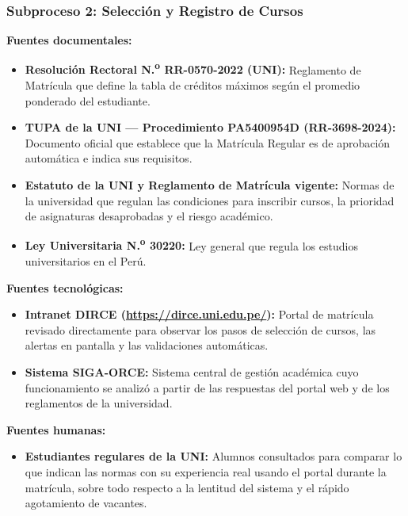 \subsubsection{Subproceso 2: Selección y Registro de Cursos}

\textbf{Fuentes documentales:}
\begin{itemize}
    \item \textbf{Resolución Rectoral N.\textsuperscript{o} RR-0570-2022 (UNI):} Reglamento de Matrícula que define la tabla de créditos máximos según el promedio ponderado del estudiante.
    \item \textbf{TUPA de la UNI --- Procedimiento PA5400954D (RR-3698-2024):} Documento oficial que establece que la Matrícula Regular es de aprobación automática e indica sus requisitos.
    \item \textbf{Estatuto de la UNI y Reglamento de Matrícula vigente:} Normas de la universidad que regulan las condiciones para inscribir cursos, la prioridad de asignaturas desaprobadas y el riesgo académico.
    \item \textbf{Ley Universitaria N.\textsuperscript{o} 30220:} Ley general que regula los estudios universitarios en el Perú.
\end{itemize}

\textbf{Fuentes tecnológicas:}
\begin{itemize}
    \item \textbf{Intranet DIRCE (\url{https://dirce.uni.edu.pe/}):} Portal de matrícula revisado directamente para observar los pasos de selección de cursos, las alertas en pantalla y las validaciones automáticas.
    \item \textbf{Sistema SIGA-ORCE:} Sistema central de gestión académica cuyo funcionamiento se analizó a partir de las respuestas del portal web y de los reglamentos de la universidad.
\end{itemize}

\textbf{Fuentes humanas:}
\begin{itemize}
    \item \textbf{Estudiantes regulares de la UNI:} Alumnos consultados para comparar lo que indican las normas con su experiencia real usando el portal durante la matrícula, sobre todo respecto a la lentitud del sistema y el rápido agotamiento de vacantes.
\end{itemize}
